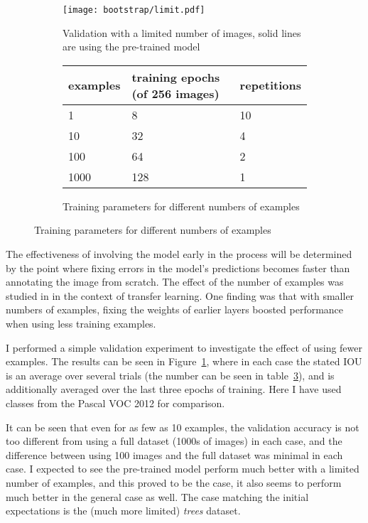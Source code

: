 \begin{figure}[ht!]
\begin{subfigure}[t]{1.0\textwidth}
  
\centering
\texttt{[image: bootstrap/limit.pdf]}
\caption {Validation with a limited number of images, solid lines are using the pre-trained model}
\label{fig:bootstrap_limited}
\end{subfigure}


\begin{subfigure}[t]{1.0\textwidth}
  \centering
 
  \begin{tabular}{ l  l  l}
    examples & training epochs (of 256 images) & repetitions \\
    \toprule
    1       & 8     & 10 \\
    10       & 32     & 4  \\
    100   & 64     & 2 \\
    1000  & 128 & 1 \\
    \bottomrule
  \end{tabular}
  
  \caption{Training parameters for different numbers of examples}

\label{fig:bootstrap_limit_params}
\end{subfigure}

\end{figure}





The effectiveness of involving the model early in the process will be determined by the point where fixing errors in the model's predictions becomes faster than annotating the image from scratch. The effect of the number of examples was studied in \cite{Soekhoe} in the context of transfer learning. One finding was that with smaller numbers of examples, fixing the weights of earlier layers boosted performance when using less training examples.

I performed a simple validation experiment to investigate the effect of using fewer examples. The results can be seen in Figure~\ref{fig:bootstrap_limited}, where in each case the stated IOU is an average over several trials (the number can be seen in table~\ref{fig:bootstrap_limit_params}), and is additionally averaged over the last three epochs of training. Here I have used classes from the Pascal VOC 2012 for comparison.

It can be seen that even for as few as 10 examples, the validation accuracy is not too different from using a full dataset (1000s of images) in each case, and the difference between using 100 images and the full dataset was minimal in each case. I expected to see the pre-trained model perform much better with a limited number of examples, and this proved to be the case,  it also seems to perform much better in the general case as well. The case matching the initial expectations is the (much more limited) \emph{trees} dataset.



